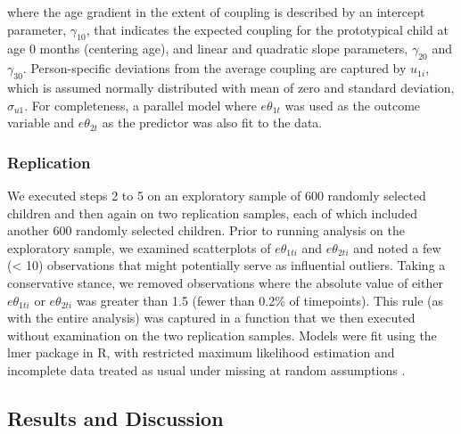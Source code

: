 \documentclass[man, floatsintext]{apa7}
\begin{document}
\noindent where the age gradient in the extent of coupling is
described by an intercept parameter, $\gamma_{10}$, that indicates the
expected coupling for the prototypical child at age 0 months (centering
age), and linear and quadratic slope parameters, $\gamma_{20}$ and
$\gamma_{30}$. Person-specific deviations from the average coupling
are captured by $u_{1i}$, which is assumed normally distributed with
mean of zero and standard deviation, $\sigma_{u1}$. For completeness,
a parallel model where $e\theta_{1t}$ was used as the outcome variable
and $e\theta_{2t}$ as the predictor was also fit to the data.

\subsubsection{Replication}

We executed steps 2 to 5 on an exploratory sample of 600 randomly selected children and then again on two replication
samples, each of which included another 600 randomly selected children. Prior to
running analysis on the exploratory sample, we examined scatterplots of
$e\theta_{1ti}$ and $e\theta_{2ti}$ and noted a few (\textless{} 10)
observations that might potentially serve as influential outliers.
Taking a conservative stance, we removed observations where the absolute
value of either $e\theta_{1ti}$ or $e\theta_{2ti}$ was greater than
1.5 (fewer than 0.2\% of timepoints). This rule (as with the entire
analysis) was captured in a function that we then executed without
examination on the two replication samples. Models were fit using the
lmer package in R, with restricted maximum likelihood estimation and
incomplete data treated as usual under missing at random assumptions
\parencite{bates2005}.


\subsection{Results and Discussion}
\end{document}
